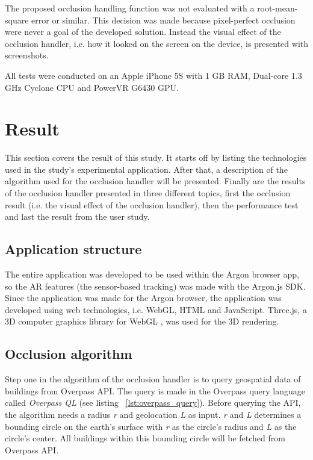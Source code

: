 The proposed occlusion handling function was not evaluated with a root-mean-square error or similar. This decision was made because pixel-perfect occlusion were never a goal of the developed solution. Instead the visual effect of the occlusion handler, i.e. how it looked on the screen on the device, is presented with screenshots.

All tests were conducted on an Apple iPhone 5S with 1 GB RAM, Dual-core 1.3 GHz Cyclone CPU and PowerVR G6430 GPU.

\section{Result}
This section covers the result of this study. It starts off by listing the technologies used in the study's experimental application. After that, a description of the algorithm used for the occlusion handler will be presented. Finally are the results of the occlusion handler presented in three different topics, first the occlusion result (i.e. the visual effect of the occlusion handler), then the performance test and last the result from the user study.

\subsection{Application structure}
The entire application was developed to be used within the Argon browser app, so the AR features (the sensor-based tracking) was made with the Argon.js SDK. Since the application was made for the Argon browser, the application was developed using web technologies, i.e. WebGL, HTML and JavaScript. Three.js, a 3D computer graphics library for WebGL \cite{threeAbout}, was used for the 3D rendering.

\subsection{Occlusion algorithm}
Step one in the algorithm of the occlusion handler is to query geospatial data of buildings from Overpass API. The query is made in the Overpass query language called \textit{Overpass QL} (see listing ~\ref{lst:overpass_query}). Before querying the API, the algorithm needs a radius \textit{r} and geolocation \textit{L} as input. \textit{r} and \textit{L} determines a bounding circle on the earth's surface with \textit{r} as the circle's radius and \textit{L} as the circle's center. All buildings within this bounding circle will be fetched from Overpass API.

